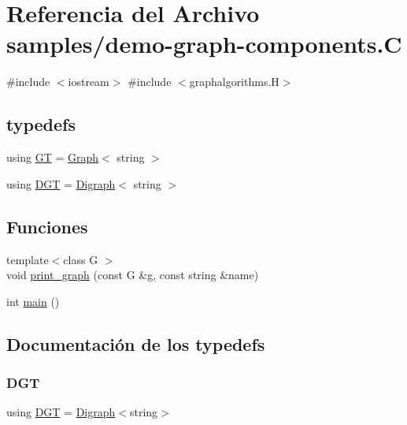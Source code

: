 \hypertarget{demo-graph-components_8_c}{}\section{Referencia del Archivo samples/demo-\/graph-\/components.C}
\label{demo-graph-components_8_c}
{\ttfamily \#include $<$iostream$>$}\newline
{\ttfamily \#include $<$graphalgorithms.\+H$>$}\newline
\subsection*{typedefs}
\begin{DoxyCompactItemize}
\item 
using \hyperlink{demo-graph-components_8_c_a668102de43ec3f9488fff7b515d48859}{GT} = \hyperlink{class_designar_1_1_graph}{Graph}$<$ string $>$
\item 
using \hyperlink{demo-graph-components_8_c_a8f123599e859454680bf37e203c0b18b}{D\+GT} = \hyperlink{class_designar_1_1_digraph}{Digraph}$<$ string $>$
\end{DoxyCompactItemize}
\subsection*{Funciones}
\begin{DoxyCompactItemize}
\item 
{\footnotesize template$<$class G $>$ }\\void \hyperlink{demo-graph-components_8_c_af4aa6ad85cbef3cd03726e2b31004df6}{print\+\_\+graph} (const G \&g, const string \&name)
\item 
int \hyperlink{demo-graph-components_8_c_ae66f6b31b5ad750f1fe042a706a4e3d4}{main} ()
\end{DoxyCompactItemize}


\subsection{Documentación de los \textquotesingle{}typedefs\textquotesingle{}}
\mbox{\label{demo-graph-components_8_c_a8f123599e859454680bf37e203c0b18b}} 
\subsubsection{\texorpdfstring{D\+GT}{DGT}}
{\footnotesize\ttfamily using \hyperlink{demo-buildgraph_8_c_ae73e956c2a8cf0a58255aa6b659985e0}{D\+GT} =  \hyperlink{class_designar_1_1_digraph}{Digraph}$<$string$>$}



